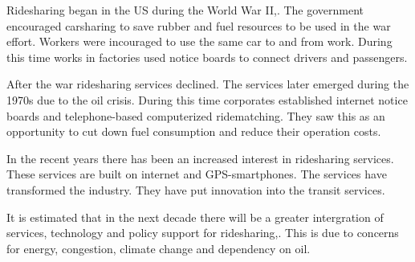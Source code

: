 Ridesharing began in the US during the World War II,\citep{ferguson1997}. The government encouraged carsharing to save rubber and fuel resources to be used in the war effort. Workers were incouraged to use the same car to and from work. During this time works in factories used notice boards to connect drivers and passengers.

After the war ridesharing services declined. The services later emerged during the 1970s due to the oil crisis. During this time corporates established internet notice boards and telephone-based computerized ridematching. They saw this as an opportunity to cut down fuel consumption and reduce their operation costs.

In the recent years there has been an increased interest in ridesharing services. These services are built on internet and GPS-smartphones. The services have transformed the industry. They have put innovation into the transit services.

It is estimated that in the next decade there will be a greater intergration of services, technology and policy support for ridesharing,\citep{chan2012}. This is due to concerns for energy, congestion, climate change and dependency on oil.